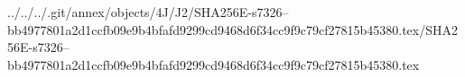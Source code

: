 ../../../.git/annex/objects/4J/J2/SHA256E-s7326--bb4977801a2d1ccfb09e9b4bfafd9299cd9468d6f34cc9f9c79cf27815b45380.tex/SHA256E-s7326--bb4977801a2d1ccfb09e9b4bfafd9299cd9468d6f34cc9f9c79cf27815b45380.tex